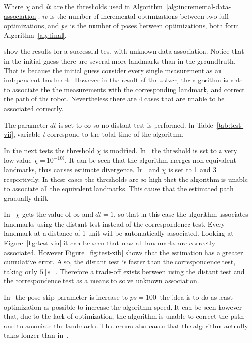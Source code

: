 Where $\chi$ and $dt$ are the thresholds used in Algorithm~\ref{alg:incremental-data-association}. $io$ is the number of incremental optimizations between two full optimizations, and $ps$ is the number of poses between optimizations, both form Algorithm~\ref{alg:final}.

 show the results for a successful test with unknown data association. Notice that in the initial guess there are several more landmarks than in the groundtruth. That is because the initial guess consider every single measurement as an independent landmark. However in the result of the solver, the algorithm is able to associate the the measurements with the corresponding landmark, and correct the path of the robot. Nevertheless there are 4 cases that are unable to be associated correctly.

The parameter $dt$ is set to $\infty$ so no distant test is performed. In Table~\ref{tab:test-vii}, variable $t$ correspond to the total time of the algorithm. 

In the next tests the threshold $\chi$ is modified. In~ the threshold is set to a very low value $\chi=10^{-100}$. It can be seen that the algorithm merges non equivalent landmarks, thus causes estimate divergence.
In~ and  $\chi$ is set to 1 and 3 respectively. In these cases the thresholds are so high that the algorithm is unable to associate all the equivalent landmarks. This cause that the estimated path gradually drift.

In~ $\chi$ gets the value of $\infty$ and $dt=1$, so that in this case the algorithm associates landmarks using the distant test instead of the correspondence test. Every landmark at a distance of 1 unit will be automatically associated. Looking at Figure~\ref{fig:test-xia} it can be seen that now all landmarks are correctly associated. However Figure~\ref{fig:test-xib} shows that the estimation has a greater cumulative error. Also, the distant test is faster than the correspondence test, taking only $5[s]$. Therefore a trade-off exists between using the distant test and the correspondence test as a means to solve unknown association.

In~ the pose skip parameter is increase to $ps=100$. the idea is to do as least optimization as possible to increase the algorithm speed. It can be seen however that, due to the lack of optimization, the algorithm is unable to correct the path and to associate the landmarks. This errors also cause that the algorithm actually takes longer than in~. 

